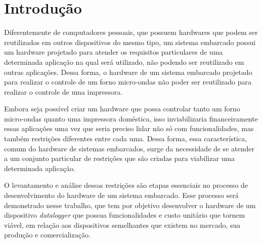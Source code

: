 \chapter{Introdução}
\label{cap:introducao}






Diferentemente de computadores pessoais, que possuem hardwares que podem ser reutilizados em outros dispositivos do mesmo tipo, um sistema embarcado possui um hardware projetado para atender os requisitos particulares de uma determinada aplicação na qual será utilizado, não podendo ser reutilizado em outras aplicações. Dessa forma, o hardware de um sistema embarcado projetado para realizar o controle de um forno micro-ondas não poder ser reutilizado para realizar o controle de uma impressora. 

Embora seja possível criar um hardware que possa controlar tanto um forno micro-ondas quanto uma impressora doméstica, isso inviabilizaria financeiramente essas aplicações uma vez que seria preciso lidar não só com funcionalidades, mas também restrições diferentes entre cada uma.
Dessa forma, essa característica, comum do hardware de sistemas embarcados, surge da necessidade de se atender a um conjunto particular de restrições que são criadas para viabilizar uma determinada aplicação.

O levantamento e análise dessas restrições são etapas essenciais no processo de desenvolvimento do hardware de um sistema embarcado. Esse processo será demonstrado nesse trabalho, que tem por objetivo desenvolver o hardware de um dispositivo \textit{datalogger} que possua funcionalidades e custo unitário que tornem viável, em relação aos dispositivos semelhantes que existem no mercado, sua produção e comercialização.





